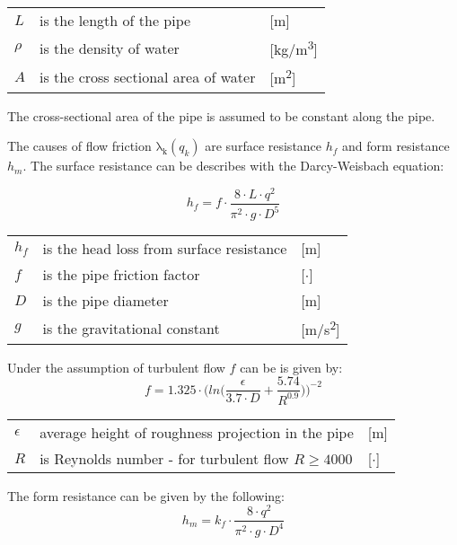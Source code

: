 	\begin{center}
		\begin{tabular}{l p{8cm} l}
			$L$ & is the length of the pipe & [\si{m}]\\
			$\rho$ & is the density of water & [\si{kg}/\si{m\cubed}]\\  
			$A$ & is the cross sectional area of water & [\si{m\squared}]\\ 
		\end{tabular}
	\end{center}
The cross-sectional area of the pipe is assumed to be constant along the pipe.

The causes of flow friction $\mathrm{\lambda_{k}}(q_{k})$ are surface resistance $h_{f}$ and form resistance $h_{m}$. The surface resistance can be describes with the Darcy-Weisbach equation:

\begin{equation}
	h_{f} = f \cdot \frac{8\cdot L\cdot q^{2}}{\pi^{2}\cdot g \cdot D^{5}}
\end{equation} 

\begin{center}
	\begin{tabular}{l p{8cm} l}
		$h_{f}$ & is the head loss from surface resistance & [\si{m}]\\
		$f$ & is the pipe friction factor & [$\cdot$]\\
		$D$ & is the pipe diameter & [\si{m}]\\
		$g$ & is the gravitational constant & [\si{m}/\si{s\squared}]\\
	\end{tabular}
\end{center}
Under the assumption of turbulent flow $f$ can be is given by:
\begin{equation}
	f=1.325\cdot \Bigg(ln\Big(\frac{\epsilon}{3.7 \cdot D}+\frac{5.74}{R^{0.9}}\Big)\Bigg)^{-2}
\end{equation}

\begin{center}
	\begin{tabular}{l p{8cm} l}
		$\epsilon$ & average height of roughness projection in the pipe & [\si{m}]\\
		$R$ &  is Reynolds number - for turbulent ﬂow $R \geq 4000$ & [$\cdot$]\\
	\end{tabular}
\end{center}

The form resistance can be given by the following:
\begin{equation}
	h_{m}=k_{f}\cdot \frac{8\cdot q^{2}}{\pi^{2}\cdot g \cdot D^{4}}
\end{equation}

